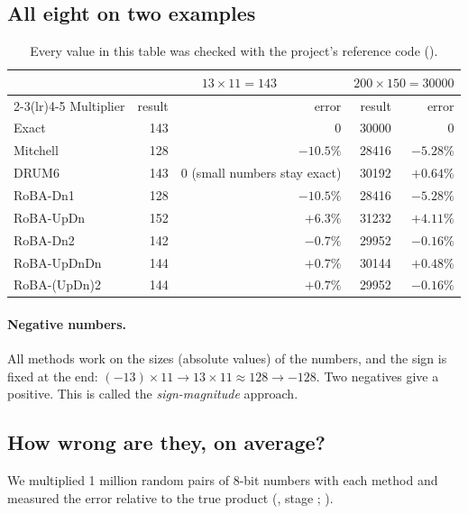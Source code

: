 \subsection{All eight on two examples}

\begin{table}[H]
\centering
\small
\begin{tabular}{lrrrr}
\toprule
 & \multicolumn{2}{c}{$13\times 11 = 143$} & \multicolumn{2}{c}{$200\times 150 = 30000$}\\
\cmidrule(lr){2-3}\cmidrule(lr){4-5}
Multiplier & result & error & result & error\\
\midrule
Exact & 143 & 0 & 30000 & 0\\
Mitchell & 128 & $-10.5\%$ & 28416 & $-5.28\%$\\
DRUM6 & 143 & 0 (small numbers stay exact) & 30192 & $+0.64\%$\\
RoBA-Dn1 & 128 & $-10.5\%$ & 28416 & $-5.28\%$\\
RoBA-UpDn & 152 & $+6.3\%$ & 31232 & $+4.11\%$\\
RoBA-Dn2 & 142 & $-0.7\%$ & 29952 & $-0.16\%$\\
RoBA-UpDnDn & 144 & $+0.7\%$ & 30144 & $+0.48\%$\\
RoBA-(UpDn)2 & 144 & $+0.7\%$ & 29952 & $-0.16\%$\\
\bottomrule
\end{tabular}
\caption{Every value in this table was checked with the project's reference code
().}
\end{table}

\paragraph{Negative numbers.} All methods work on the sizes (absolute values) of the numbers, and the
sign is fixed at the end: $(-13)\times 11 \to 13\times 11 \approx 128 \to -128$. Two negatives give a
positive. This is called the \emph{sign-magnitude} approach.

\subsection{How wrong are they, on average?}\label{sec:errors}

We multiplied 1 million random pairs of 8-bit numbers with each method and measured the error
relative to the true product (, stage ;
).

